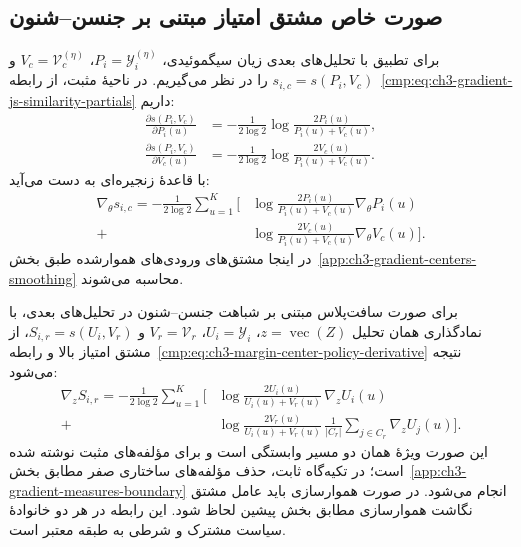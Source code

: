 \subsection{صورت خاص مشتق امتیاز مبتنی بر جنسن--شنون}
\label{app:ch3-gradient-centers-js-special}

برای تطبیق با تحلیل‌های بعدی زیان سیگموئیدی،
$P_i=\mathscr Y_i^{(\eta)}$،
$V_c=\mathcal V_c^{(\eta)}$ و
$s_{i,c}=s(P_i,V_c)$ را در نظر می‌گیریم.
در ناحیهٔ مثبت، از
رابطه~\eqref{cmp:eq:ch3-gradient-js-similarity-partials}
داریم:
\begin{equation}\label{cmp:eq:ch3-margin-JS-partials}
\begin{aligned}
\frac{\partial s(P_i,V_c)}{\partial P_i(u)}
&=-\frac1{2\log2}\log\frac{2P_i(u)}{P_i(u)+V_c(u)},\\
\frac{\partial s(P_i,V_c)}{\partial V_c(u)}
&=-\frac1{2\log2}\log\frac{2V_c(u)}{P_i(u)+V_c(u)}.
\end{aligned}
\end{equation}
با قاعدهٔ زنجیره‌ای به دست می‌آید:
\begin{equation}\label{cmp:eq:ch3-margin-score-policy-gradient}
\begin{aligned}
\nabla_\theta s_{i,c}
=-\frac1{2\log2}\sum_{u=1}^{K}\Bigg[
&\log\frac{2P_i(u)}{P_i(u)+V_c(u)}\nabla_\theta P_i(u)\\
+&\log\frac{2V_c(u)}{P_i(u)+V_c(u)}\nabla_\theta V_c(u)
\Bigg].
\end{aligned}
\end{equation}
در اینجا مشتق‌های ورودی‌های هموارشده طبق
بخش~\ref{app:ch3-gradient-centers-smoothing}
محاسبه می‌شوند.

برای صورت سافت‌پلاس مبتنی بر شباهت جنسن--شنون
در تحلیل‌های بعدی، با نمادگذاری همان تحلیل
$z=\operatorname{vec}(Z)$،
$U_i=\mathscr Y_i$،
$V_r=\mathcal V_r$ و $S_{i,r}=s(U_i,V_r)$،
از مشتق امتیاز بالا و
رابطه~\eqref{cmp:eq:ch3-margin-center-policy-derivative}
نتیجه می‌شود:
\begin{equation}\label{cmp:eq:ch3-softplus-js-score-chain}
\begin{aligned}
\nabla_z S_{i,r}
=-\frac1{2\log2}\sum_{u=1}^{K}\Bigg[
&\log\frac{2U_i(u)}{U_i(u)+V_r(u)}\,\nabla_z U_i(u)\\
+&\log\frac{2V_r(u)}{U_i(u)+V_r(u)}
\,\frac1{|C_r|}\sum_{j\in C_r}\nabla_z U_j(u)
\Bigg].
\end{aligned}
\end{equation}
این صورت ویژهٔ همان دو مسیر وابستگی است و
برای مؤلفه‌های مثبت نوشته شده است؛ در
تکیه‌گاه ثابت، حذف مؤلفه‌های ساختاری صفر
مطابق بخش~\ref{app:ch3-gradient-measures-boundary}
انجام می‌شود. در صورت هموارسازی باید عامل
مشتق نگاشت هموارسازی مطابق بخش پیشین
لحاظ شود. این رابطه در هر دو خانوادهٔ سیاست
مشترک و شرطی به طبقه معتبر است.

